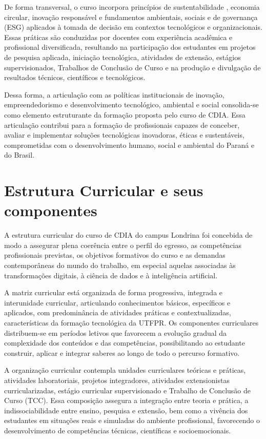 De forma transversal, o curso incorpora princípios de sustentabilidade \cite{UTFPR_SUST_2022}, economia circular, inovação responsável e fundamentos ambientais, sociais e de governança (ESG) aplicados à tomada de decisão em contextos tecnológicos e organizacionais. Essas práticas são conduzidas por docentes com experiência acadêmica e profissional diversificada, resultando na participação dos estudantes em projetos de pesquisa aplicada, iniciação tecnológica, atividades de extensão, estágios supervisionados, Trabalhos de Conclusão de Curso e na produção e divulgação de resultados técnicos, científicos e tecnológicos.

Dessa forma, a articulação com as políticas institucionais de inovação, empreendedorismo e desenvolvimento tecnológico, ambiental e social consolida-se como elemento estruturante da formação proposta pelo curso de CDIA. Essa articulação contribui para a formação de profissionais capazes de conceber, avaliar e implementar soluções tecnológicas inovadoras, éticas e sustentáveis, comprometidas com o desenvolvimento humano, social e ambiental do Paraná e do Brasil.


\section{Estrutura Curricular e seus componentes}

A estrutura curricular do curso de CDIA do campus Londrina foi concebida de modo a assegurar plena coerência entre o perfil do egresso, as competências profissionais previstas, os objetivos formativos do curso e as demandas contemporâneas do mundo do trabalho, em especial aquelas associadas às transformações digitais, à ciência de dados e à inteligência artificial.

A matriz curricular está organizada de forma progressiva, integrada e interunidade curricular, articulando conhecimentos básicos, específicos e aplicados, com predominância de atividades práticas e contextualizadas, características da formação tecnológica da UTFPR. Os componentes curriculares distribuem-se em períodos letivos que favorecem a evolução gradual da complexidade dos conteúdos e das competências, possibilitando ao estudante construir, aplicar e integrar saberes ao longo de todo o percurso formativo.

A organização curricular contempla unidades curriculares teóricas e práticas, atividades laboratoriais, projetos integradores, atividades extensionistas curricularizadas, estágio curricular supervisionado e Trabalho de Conclusão de Curso (TCC). Essa composição assegura a integração entre teoria e prática, a indissociabilidade entre ensino, pesquisa e extensão, bem como a vivência dos estudantes em situações reais e simuladas do ambiente profissional, favorecendo o desenvolvimento de competências técnicas, científicas e socioemocionais.


